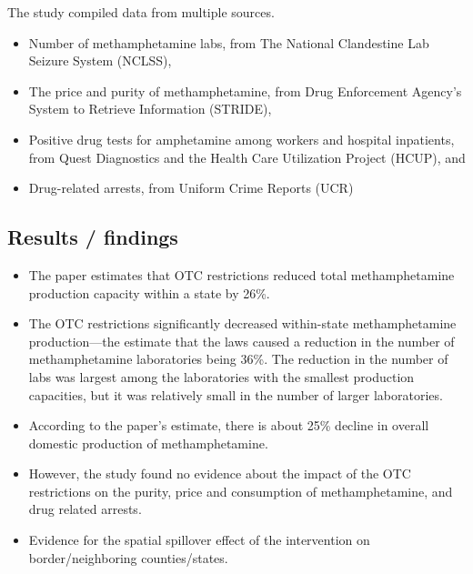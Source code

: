 \documentclass[
  11pt,
]{article}
\providecommand{\tightlist}{%
  \setlength{\itemsep}{0pt}\setlength{\parskip}{0pt}}
\begin{document}
The study compiled data from multiple sources.

\begin{itemize}
\tightlist
\item
  Number of methamphetamine labs, from The National Clandestine Lab
  Seizure System (NCLSS),\\
\item
  The price and purity of methamphetamine, from Drug Enforcement
  Agency's System to Retrieve Information (STRIDE),\\
\item
  Positive drug tests for amphetamine among workers and hospital
  inpatients, from Quest Diagnostics and the Health Care Utilization
  Project (HCUP), and\\
\item
  Drug-related arrests, from Uniform Crime Reports (UCR)
\end{itemize}

\hypertarget{results-findings}{%
\subsection*{Results / findings}\label{results-findings}}

\begin{itemize}
\item
  The paper estimates that OTC restrictions reduced total
  methamphetamine production capacity within a state by 26\%.
\item
  The OTC restrictions significantly decreased within-state
  methamphetamine production---the estimate that the laws caused a
  reduction in the number of methamphetamine laboratories being 36\%.
  The reduction in the number of labs was largest among the laboratories
  with the smallest production capacities, but it was relatively small
  in the number of larger laboratories.
\item
  According to the paper's estimate, there is about 25\% decline in
  overall domestic production of methamphetamine.
\item
  However, the study found no evidence about the impact of the OTC
  restrictions on the purity, price and consumption of methamphetamine,
  and drug related arrests.
\item
  Evidence for the spatial spillover effect of the intervention on
  border/neighboring counties/states.
\end{itemize}
\end{document}
